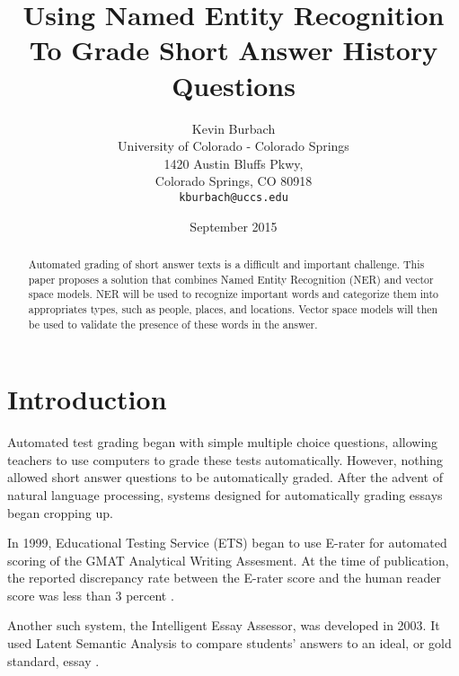 \documentclass{sig-alternate}
\begin{document}
\title{Using Named Entity Recognition To Grade Short Answer History Questions}
\author{Kevin Burbach\\
        University of Colorado - Colorado Springs\\
        1420 Austin Bluffs Pkwy,\\
        Colorado Springs, CO 80918\\
        \texttt{kburbach@uccs.edu}
       }
\date{September 2015}

\maketitle

\begin{abstract}
   Automated grading of short answer texts is a difficult and important challenge. This paper proposes a solution that combines Named Entity Recognition (NER) and vector space models. NER will be used to recognize important words and categorize them into appropriates types, such as people, places, and locations. Vector space models will then be used to validate the presence of these words in the answer.
\end{abstract}

\section{Introduction}
Automated test grading began with simple multiple choice questions, allowing teachers to use computers to grade these tests automatically. However, nothing allowed short answer questions to be automatically graded. After the advent of natural language processing, systems designed for automatically grading essays began cropping up.

In 1999, Educational Testing Service (ETS) began to use E-rater for automated scoring of the GMAT Analytical Writing Assesment. At the time of publication, the reported discrepancy rate between the E-rater score and the human reader score was less than 3 percent \cite{burstein_pdf}. 

Another such system, the Intelligent Essay Assessor, was developed in 2003. It used Latent Semantic Analysis to compare students' answers to an ideal, or gold standard, essay \cite{auto_marking}.





{}

\end{document}
